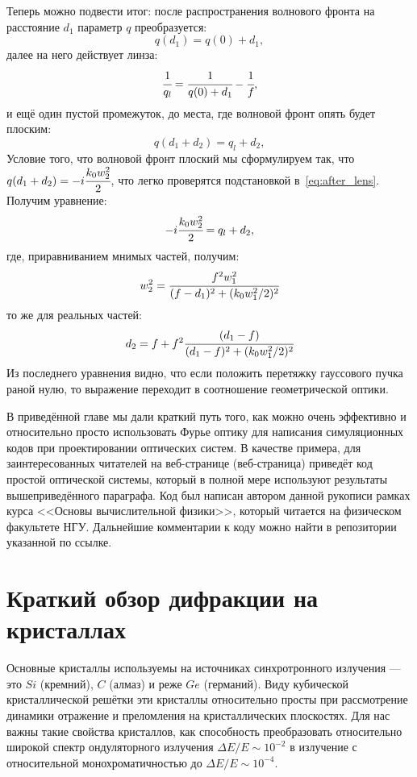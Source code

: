 Теперь можно подвести итог: после распространения волнового фронта на расстояние $d_1$ параметр $q$ преобразуется:
\begin{equation}
q(d_1) = q(0) + d_1, 
\end{equation}
далее на него действует линза: 
\begin{equation}
\cfrac{1}{q_l} = \cfrac{1}{q(0) + d_1} - \cfrac{1}{f},
\end{equation}
и ещё один пустой промежуток, до места, где волновой фронт опять будет плоским: 
\begin{equation}
q(d_1 + d_2) = q_l + d_2, 
\end{equation}
Условие того, что волновой фронт плоский мы сформулируем так, что $q(d_1 + d_2) = -i\cfrac{k_0w^2_2}{2}$, что легко проверятся подстановкой в~\ref{eq:after_lens}. Получим уравнение: 
\begin{equation}
-i\cfrac{k_0w^2_2}{2} = q_l + d_2, 
\end{equation}
где, приравниванием мнимых частей, получим: 
\begin{equation}
w^2_2 = \cfrac{f^2w^2_1}{(f - d_1)^2 + (k_0w^2_1/2)^2}
\end{equation}
то же для реальных частей: 
\begin{equation}
d_2 = f + f^2\cfrac{(d_1 - f)}{(d_1 - f)^2 + (k_0w^2_1/2)^2}
\end{equation}
Из последнего уравнения видно, что если положить перетяжку гауссового пучка раной нулю, то выражение переходит в соотношение геометрической оптики.

В приведённой главе мы дали краткий путь того, как можно очень эффективно и относительно просто использовать Фурье оптику для написания симуляционных кодов при проектировании оптических систем. В качестве примера, для заинтересованных читателей на веб-странице (веб-страница) приведёт код простой оптической системы, который в полной мере используют результаты вышеприведённого параграфа. Код был написан автором данной рукописи рамках курса <<Основы вычислительной физики>>, который читается на физическом факультете НГУ. Дальнейшие комментарии к коду можно найти в репозитории указанной по ссылке.
\fi

\chapter{Краткий обзор дифракции на кристаллах}
Основные кристаллы используемы на источниках синхротронного излучения --- это $Si$ (кремний), $C$ (алмаз) и реже $Ge$ (германий). Виду кубической кристаллической решётки эти кристаллы относительно просты при рассмотрение динамики отражение и преломления на кристаллических плоскостях. Для нас важны такие свойства кристаллов, как способность преобразовать относительно широкой спектр ондуляторного излучения $\Delta E/ E \sim 10^{-2}$ в излучение с относительной монохроматичностью до $\Delta E/ E \sim 10^{-4}$. 
